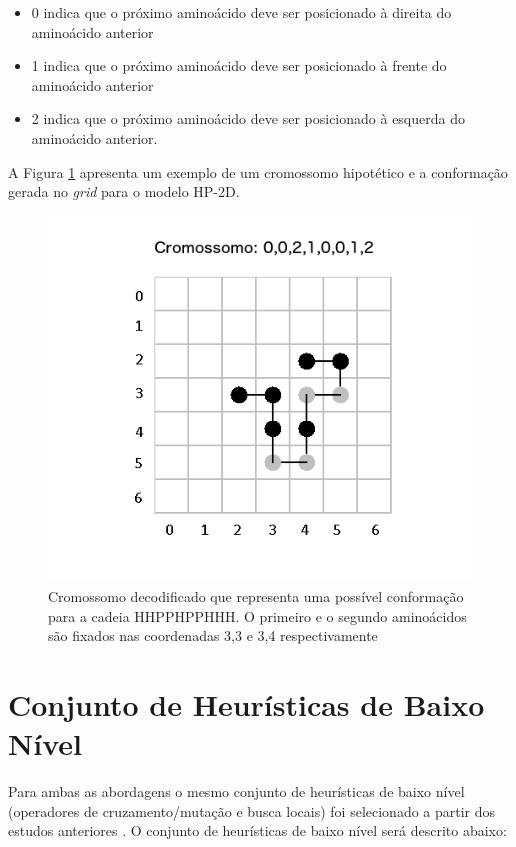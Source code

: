 \begin{itemize}
	\item 0 indica que o próximo aminoácido deve ser posicionado à direita do aminoácido anterior
	\item 1 indica que o próximo aminoácido deve ser posicionado à frente do aminoácido anterior
	\item 2 indica que o próximo aminoácido deve ser posicionado à esquerda do aminoácido anterior.
\end{itemize}

A Figura \ref{img:cromossomo} apresenta um exemplo de um cromossomo hipotético e a conformação gerada no \textit{grid} para o modelo HP-2D.


\begin{figure}[!htb]
	\centering
	\includegraphics[scale=0.46]{Imagens/DecodedCromossome.png}
	\caption{Cromossomo decodificado que representa uma possível conformação para a cadeia HHPPHPPHHH. O primeiro e o segundo aminoácidos são fixados nas coordenadas 3,3 e 3,4 respectivamente  }
	\label{img:cromossomo}
\end{figure}


\section{Conjunto de Heurísticas de Baixo Nível}
\label{section:llhset}
Para ambas as abordagens o mesmo conjunto de heurísticas de baixo nível (operadores de cruzamento/mutação e busca locais) foi selecionado a partir dos estudos anteriores \cite{custodio2014multiple, custodio2004investigation, garza2012locality,benitez2015algoritmo}. O conjunto de heurísticas de baixo nível será descrito abaixo:


